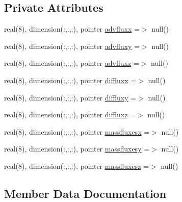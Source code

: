\subsection*{Private Attributes}
\begin{DoxyCompactItemize}
\item 
real(8), dimension(\+:,\+:,\+:), pointer \mbox{\hyperlink{structmoduleporousmediaproperties_1_1t__fluxes_ade8a70748c6f1d8c278de44c87345f6c}{advfluxx}} =$>$ null()
\item 
real(8), dimension(\+:,\+:,\+:), pointer \mbox{\hyperlink{structmoduleporousmediaproperties_1_1t__fluxes_aaf2c7fdc3b8e1b67c35fbe686c4cca54}{advfluxy}} =$>$ null()
\item 
real(8), dimension(\+:,\+:,\+:), pointer \mbox{\hyperlink{structmoduleporousmediaproperties_1_1t__fluxes_aee3c235489d0c551933d0c1f1aa2f8ed}{advfluxz}} =$>$ null()
\item 
real(8), dimension(\+:,\+:,\+:), pointer \mbox{\hyperlink{structmoduleporousmediaproperties_1_1t__fluxes_ad2029f12ea0fb8a702700770d2757cb7}{diffluxx}} =$>$ null()
\item 
real(8), dimension(\+:,\+:,\+:), pointer \mbox{\hyperlink{structmoduleporousmediaproperties_1_1t__fluxes_aec564123ea46fdca2735263fa282099e}{diffluxy}} =$>$ null()
\item 
real(8), dimension(\+:,\+:,\+:), pointer \mbox{\hyperlink{structmoduleporousmediaproperties_1_1t__fluxes_a09442f982929952f88921e2b82d8a99d}{diffluxz}} =$>$ null()
\item 
real(8), dimension(\+:,\+:,\+:), pointer \mbox{\hyperlink{structmoduleporousmediaproperties_1_1t__fluxes_a13a3b3649f608eb8d2d40079fff73129}{massfluxesx}} =$>$ null()
\item 
real(8), dimension(\+:,\+:,\+:), pointer \mbox{\hyperlink{structmoduleporousmediaproperties_1_1t__fluxes_af045032f114b7dc00fa1f3f54f49b727}{massfluxesy}} =$>$ null()
\item 
real(8), dimension(\+:,\+:,\+:), pointer \mbox{\hyperlink{structmoduleporousmediaproperties_1_1t__fluxes_a00320f19cfc1450f86dc96a1036f0707}{massfluxesz}} =$>$ null()
\end{DoxyCompactItemize}


\subsection{Member Data Documentation}
\mbox{\label{structmoduleporousmediaproperties_1_1t__fluxes_ade8a70748c6f1d8c278de44c87345f6c}} 
